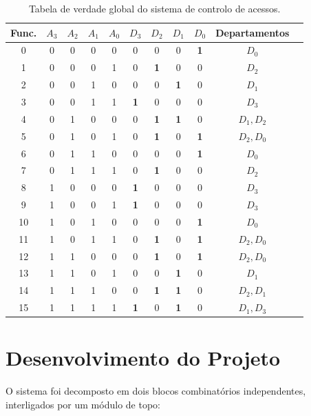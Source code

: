 \documentclass[12pt]{article}
\begin{document}
\begin{table}[!h]\footnotesize
	\centering
	\caption{Tabela de verdade global do sistema de controlo de acessos.}
	\renewcommand{\arraystretch}{1.15}
	\begin{tabular}{ccccccccccc}
	\toprule
	\textbf{Func.} & \textbf{$A_3$} & \textbf{$A_2$} & \textbf{$A_1$} &
	\textbf{$A_0$} & \textbf{$D_3$} & \textbf{$D_2$} & \textbf{$D_1$} &
	\textbf{$D_0$} & \textbf{Departamentos} \\
	\midrule
	0  & 0 & 0 & 0 & 0 & 0 & 0 & 0 & \textbf{1} & $D_0$ \\
	1  & 0 & 0 & 0 & 1 & 0 & \textbf{1} & 0 & 0 & $D_2$ \\
	2  & 0 & 0 & 1 & 0 & 0 & 0 & \textbf{1} & 0 & $D_1$ \\
	3  & 0 & 0 & 1 & 1 & \textbf{1} & 0 & 0 & 0 & $D_3$ \\
	4  & 0 & 1 & 0 & 0 & 0 & \textbf{1} & \textbf{1} & 0 & $D_1, D_2$ \\
	5  & 0 & 1 & 0 & 1 & 0 & \textbf{1} & 0 & \textbf{1} & $D_2, D_0$ \\
	6  & 0 & 1 & 1 & 0 & 0 & 0 & 0 & \textbf{1} & $D_0$ \\
	7  & 0 & 1 & 1 & 1 & 0 & \textbf{1} & 0 & 0 & $D_2$ \\
	8  & 1 & 0 & 0 & 0 & \textbf{1} & 0 & 0 & 0 & $D_3$ \\
	9  & 1 & 0 & 0 & 1 & \textbf{1} & 0 & 0 & 0 & $D_3$ \\
	10 & 1 & 0 & 1 & 0 & 0 & 0 & 0 & \textbf{1} & $D_0$ \\
	11 & 1 & 0 & 1 & 1 & 0 & \textbf{1} & 0 & \textbf{1} & $D_2, D_0$ \\
	12 & 1 & 1 & 0 & 0 & 0 & \textbf{1} & 0 & \textbf{1} & $D_2, D_0$ \\
	13 & 1 & 1 & 0 & 1 & 0 & 0 & \textbf{1} & 0 & $D_1$ \\
	14 & 1 & 1 & 1 & 0 & 0 & \textbf{1} & \textbf{1} & 0 & $D_2, D_1$ \\
	15 & 1 & 1 & 1 & 1 & \textbf{1} & 0 & \textbf{1} & 0 & $D_1, D_3$ \\
	\bottomrule
	\end{tabular}

	\label{tab:verdade}
\end{table}

\section{Desenvolvimento do Projeto}
O sistema foi decomposto em dois blocos combinatórios independentes,
interligados por um módulo de topo:
\end{document}
